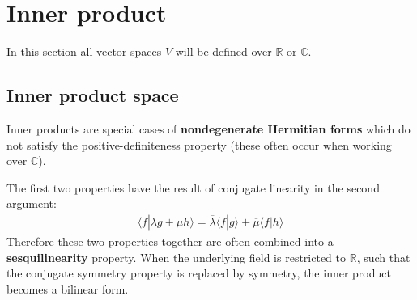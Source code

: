 \section{Inner product}\label{linalgebra:innerproduct}

    In this section all vector spaces $V$ will be defined over $\mathbb{R}$ or $\mathbb{C}$.

\subsection{Inner product space}

    \begin{remark}\label{linalgebra:NDH_form}
        Inner products are special cases of \textbf{nondegenerate Hermitian forms} which do not satisfy the positive-definiteness property (these often occur when working over $\mathbb{C}$).
    \end{remark}

    \begin{result}
        The first two properties have the result of conjugate linearity in the second argument:
        \begin{gather}
            \langle f|\lambda g + \mu h \rangle = \overline{\lambda}\langle f|g \rangle + \overline{\mu}\langle f|h \rangle
        \end{gather}
        Therefore these two properties together are often combined into a \textbf{sesquilinearity} property. When the underlying field is restricted to $\mathbb{R}$, such that the conjugate symmetry property is replaced by symmetry, the inner product becomes a bilinear form.
    \end{result}

